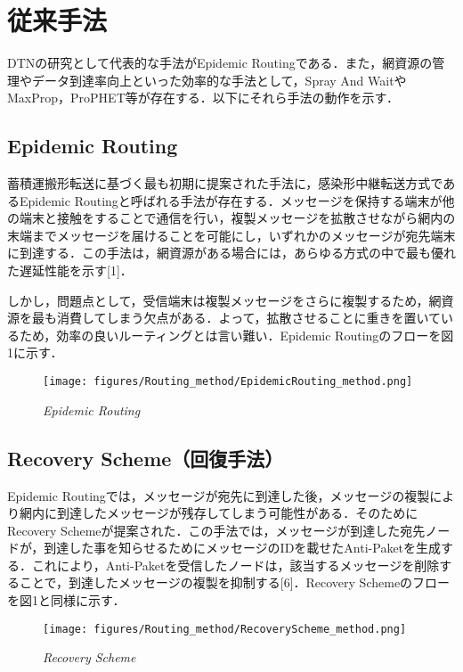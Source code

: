 \documentclass[11pt]{icsthesis}
\begin{document}
\section{従来手法}
DTNの研究として代表的な手法がEpidemic Routingである．また，網資源の管理やデータ到達率向上といった効率的な手法として，Spray And WaitやMaxProp，ProPHET等が存在する．以下にそれら手法の動作を示す．

\subsection{Epidemic Routing}
蓄積運搬形転送に基づく最も初期に提案された手法に，感染形中継転送方式であるEpidemic Routingと呼ばれる手法が存在する．メッセージを保持する端末が他の端末と接触をすることで通信を行い，複製メッセージを拡散させながら網内の末端までメッセージを届けることを可能にし，いずれかのメッセージが宛先端末に到達する．この手法は，網資源がある場合には，あらゆる方式の中で最も優れた遅延性能を示す[1]．

しかし，問題点として，受信端末は複製メッセージをさらに複製するため，網資源を最も消費してしまう欠点がある．よって，拡散させることに重きを置いているため，効率の良いルーティングとは言い難い．Epidemic Routingのフローを図1に示す．

\begin{figure}[h]
	\centering
	\texttt{[image: figures/Routing\_method/EpidemicRouting\_method.png]}
	\caption[]{\it{Epidemic Routing}}
	\label{EpidemicRouting}
\end{figure}

\newpage

\subsection{Recovery Scheme（回復手法）}
Epidemic Routingでは，メッセージが宛先に到達した後，メッセージの複製により網内に到達したメッセージが残存してしまう可能性がある．そのためにRecovery Schemeが提案された．この手法では，メッセージが到達した宛先ノードが，到達した事を知らせるためにメッセージのIDを載せたAnti-Paketを生成する．これにより，Anti-Paketを受信したノードは，該当するメッセージを削除することで，到達したメッセージの複製を抑制する[6]．Recovery Schemeのフローを図1と同様に示す．

\begin{figure}[h]
	\centering
	\texttt{[image: figures/Routing\_method/RecoveryScheme\_method.png]}
	\caption[]{\it{Recovery Scheme}}
	\label{RecoveryScheme}
\end{figure}
\end{document}

